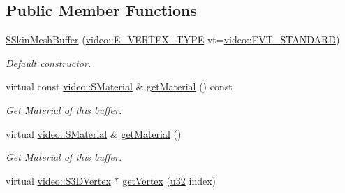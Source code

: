 \subsection*{Public Member Functions}
\begin{DoxyCompactItemize}
\item 
\mbox{\label{structirr_1_1scene_1_1SSkinMeshBuffer_aa80de8556499e8038b037ea39e702b93}} 
\hyperlink{structirr_1_1scene_1_1SSkinMeshBuffer_aa80de8556499e8038b037ea39e702b93}{S\+Skin\+Mesh\+Buffer} (\hyperlink{namespaceirr_1_1video_a0e3b59e025e0d0db0ed2ee0ce904deac}{video\+::\+E\+\_\+\+V\+E\+R\+T\+E\+X\+\_\+\+T\+Y\+PE} vt=\hyperlink{namespaceirr_1_1video_a0e3b59e025e0d0db0ed2ee0ce904deaca98c8b791280bbf9252c4f4a37e91a416}{video\+::\+E\+V\+T\+\_\+\+S\+T\+A\+N\+D\+A\+RD})
\begin{DoxyCompactList}\small\item\em Default constructor. \end{DoxyCompactList}\item 
\mbox{\label{structirr_1_1scene_1_1SSkinMeshBuffer_a0ba6d4da9bbb92c5aa9c7c70225d3eb6}} 
virtual const \hyperlink{classirr_1_1video_1_1SMaterial}{video\+::\+S\+Material} \& \hyperlink{structirr_1_1scene_1_1SSkinMeshBuffer_a0ba6d4da9bbb92c5aa9c7c70225d3eb6}{get\+Material} () const
\begin{DoxyCompactList}\small\item\em Get Material of this buffer. \end{DoxyCompactList}\item 
\mbox{\label{structirr_1_1scene_1_1SSkinMeshBuffer_a5e4a6cc69dac5ac75d43d8e89a23da2b}} 
virtual \hyperlink{classirr_1_1video_1_1SMaterial}{video\+::\+S\+Material} \& \hyperlink{structirr_1_1scene_1_1SSkinMeshBuffer_a5e4a6cc69dac5ac75d43d8e89a23da2b}{get\+Material} ()
\begin{DoxyCompactList}\small\item\em Get Material of this buffer. \end{DoxyCompactList}\item 
\mbox{\label{structirr_1_1scene_1_1SSkinMeshBuffer_a3773a0f0d5995080960d9d098f9f051e}} 
virtual \hyperlink{structirr_1_1video_1_1S3DVertex}{video\+::\+S3\+D\+Vertex} $\ast$ \hyperlink{structirr_1_1scene_1_1SSkinMeshBuffer_a3773a0f0d5995080960d9d098f9f051e}{get\+Vertex} (\hyperlink{namespaceirr_a0416a53257075833e7002efd0a18e804}{u32} index)

\end{DoxyCompactItemize}

